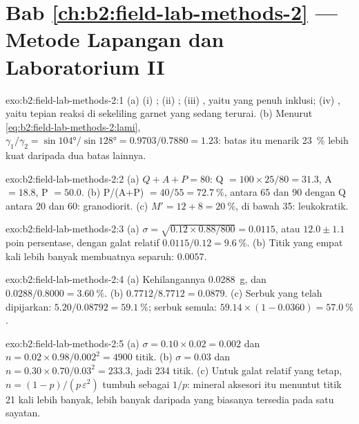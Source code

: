 \section*{Bab \ref{ch:b2:field-lab-methods-2} --- Metode Lapangan dan Laboratorium II}

\begin{solution}{exo:b2:field-lab-methods-2:1}
(a) (i) ; (ii) ; (iii) , yaitu  yang penuh
inklusi; (iv) , yaitu tepian reaksi di sekeliling garnet yang sedang terurai. (b) Menurut
\eqref{eq:b2:field-lab-methods-2:lami}, $\gamma_1/\gamma_2 = \sin\ang{104}/\sin\ang{128} =
0.9703/0.7880 = 1.23$: batas itu menarik \qty{23}{\percent} lebih kuat daripada dua batas lainnya.
\end{solution}

\begin{solution}{exo:b2:field-lab-methods-2:2}
(a) $Q + A + P = 80$: Q $= 100 \times 25/80 = 31.3$, A $= 18.8$, P $= 50.0$. (b) P/(A+P) $=
40/55 = \qty{72.7}{\percent}$, antara 65 dan 90 dengan Q antara 20 dan 60: granodiorit.
(c) $M' = 12 + 8 = \qty{20}{\percent}$, di bawah 35: leukokratik.
\end{solution}

\begin{solution}{exo:b2:field-lab-methods-2:3}
(a) $\sigma = \sqrt{0.12 \times 0.88/800} = 0.0115$, atau $12.0 \pm 1.1$ poin persentase, dengan
galat relatif $0.0115/0.12 = \qty{9.6}{\percent}$. (b) Titik yang empat kali lebih banyak membuatnya separuh: $0.0057$.
\end{solution}

\begin{solution}{exo:b2:field-lab-methods-2:4}
(a) Kehilangannya \qty{0.0288}{g}, dan $0.0288/0.8000 = \qty{3.60}{\percent}$.
(b) $0.7712/8.7712 = 0.0879$.
(c) Serbuk yang telah dipijarkan: $5.20/0.08792 = \qty{59.1}{\percent}$; serbuk semula:
$59.14 \times (1 - 0.0360) = \qty{57.0}{\percent}$.
\end{solution}

\begin{solution}{exo:b2:field-lab-methods-2:5}
(a) $\sigma = 0.10 \times 0.02 = 0.002$ dan $n = 0.02 \times 0.98/0.002^2 = 4900$ titik.
(b) $\sigma = 0.03$ dan $n = 0.30 \times 0.70/0.03^2 = 233.3$, jadi 234 titik. (c) Untuk galat relatif
yang tetap, $n = (1-p)/(p\,\varepsilon^2)$ tumbuh sebagai $1/p$: mineral aksesori itu menuntut titik 21 kali lebih
banyak, lebih banyak daripada yang biasanya tersedia pada satu sayatan.
\end{solution}

